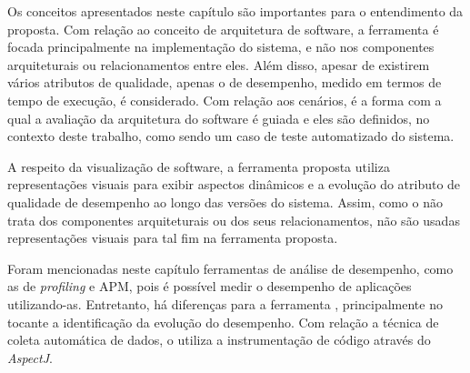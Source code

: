 Os conceitos apresentados neste capítulo são importantes para o entendimento da proposta. Com relação ao conceito de arquitetura de software, a ferramenta \textit{\perfMinerName} é focada principalmente na implementação do sistema, e não nos componentes arquiteturais ou relacionamentos entre eles. Além disso, apesar de existirem vários atributos de qualidade, apenas o de desempenho, medido em termos de tempo de execução, é considerado. Com relação aos cenários, é a forma com a qual a avaliação da arquitetura do software é guiada e eles são definidos, no contexto deste trabalho, como sendo um caso de teste automatizado do sistema.

A respeito da visualização de software, a ferramenta proposta utiliza representações visuais para exibir aspectos dinâmicos e a evolução do atributo de qualidade de desempenho ao longo das versões do sistema. Assim, como o \textit{\perfMinerName} não trata dos componentes arquiteturais ou dos seus relacionamentos, não são usadas representações visuais para tal fim na ferramenta proposta.

Foram mencionadas neste capítulo ferramentas de análise de desempenho, como as de \textit{profiling} e APM, pois é possível medir o desempenho de aplicações utilizando-as. Entretanto, há diferenças para a ferramenta \textit{\toolName}, principalmente no tocante a identificação da evolução do desempenho. Com relação a técnica de coleta automática de dados, o \textit{\perfMinerName} utiliza a instrumentação de código através do \textit{AspectJ}.